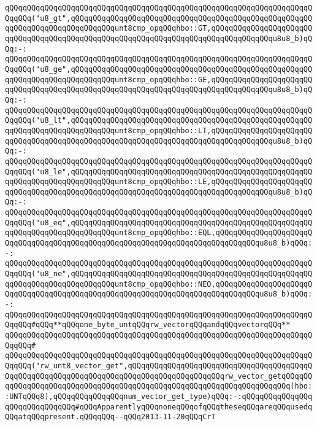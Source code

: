 \newline
\verb|qQQqqQQqqQQqqQQqqQQqqQQqqQQqqQQqqQQqqQQqqQQqqQQqqQQqqQQqqQQqqQQqqQQqqQQqqQQq("u8_gt",qQQqqQQqqQQqqQQqqQQqqQQqqQQqqQQqqQQqqQQqqQQqqQQqqQQqqQQqqQQqqQQqqQQqqQQqqQQqqQQqunt8cmp_opqQQqhbo::GT,qQQqqQQqqQQqqQQqqQQqqQQqqQQqqQQqqQQqqQQqqQQqqQQqqQQqqQQqqQQqqQQqqQQqqQQqqQQqqQQqqQQqu8u8_b)qQQq:-:|\newline
\verb|qQQqqQQqqQQqqQQqqQQqqQQqqQQqqQQqqQQqqQQqqQQqqQQqqQQqqQQqqQQqqQQqqQQqqQQqqQQq("u8_ge",qQQqqQQqqQQqqQQqqQQqqQQqqQQqqQQqqQQqqQQqqQQqqQQqqQQqqQQqqQQqqQQqqQQqqQQqqQQqqQQqunt8cmp_opqQQqhbo::GE,qQQqqQQqqQQqqQQqqQQqqQQqqQQqqQQqqQQqqQQqqQQqqQQqqQQqqQQqqQQqqQQqqQQqqQQqqQQqqQQqqQQqu8u8_b)qQQq:-:|\newline
\verb|qQQqqQQqqQQqqQQqqQQqqQQqqQQqqQQqqQQqqQQqqQQqqQQqqQQqqQQqqQQqqQQqqQQqqQQqqQQq("u8_lt",qQQqqQQqqQQqqQQqqQQqqQQqqQQqqQQqqQQqqQQqqQQqqQQqqQQqqQQqqQQqqQQqqQQqqQQqqQQqqQQqunt8cmp_opqQQqhbo::LT,qQQqqQQqqQQqqQQqqQQqqQQqqQQqqQQqqQQqqQQqqQQqqQQqqQQqqQQqqQQqqQQqqQQqqQQqqQQqqQQqqQQqu8u8_b)qQQq:-:|\newline
\verb|qQQqqQQqqQQqqQQqqQQqqQQqqQQqqQQqqQQqqQQqqQQqqQQqqQQqqQQqqQQqqQQqqQQqqQQqqQQq("u8_le",qQQqqQQqqQQqqQQqqQQqqQQqqQQqqQQqqQQqqQQqqQQqqQQqqQQqqQQqqQQqqQQqqQQqqQQqqQQqqQQqunt8cmp_opqQQqhbo::LE,qQQqqQQqqQQqqQQqqQQqqQQqqQQqqQQqqQQqqQQqqQQqqQQqqQQqqQQqqQQqqQQqqQQqqQQqqQQqqQQqqQQqu8u8_b)qQQq:-:|\newline
\verb|qQQqqQQqqQQqqQQqqQQqqQQqqQQqqQQqqQQqqQQqqQQqqQQqqQQqqQQqqQQqqQQqqQQqqQQqqQQq("u8_eq",qQQqqQQqqQQqqQQqqQQqqQQqqQQqqQQqqQQqqQQqqQQqqQQqqQQqqQQqqQQqqQQqqQQqqQQqqQQqqQQqunt8cmp_opqQQqhbo::EQL,qQQqqQQqqQQqqQQqqQQqqQQqqQQqqQQqqQQqqQQqqQQqqQQqqQQqqQQqqQQqqQQqqQQqqQQqqQQqqQQqu8u8_b)qQQq:-:|\newline
\verb|qQQqqQQqqQQqqQQqqQQqqQQqqQQqqQQqqQQqqQQqqQQqqQQqqQQqqQQqqQQqqQQqqQQqqQQqqQQq("u8_ne",qQQqqQQqqQQqqQQqqQQqqQQqqQQqqQQqqQQqqQQqqQQqqQQqqQQqqQQqqQQqqQQqqQQqqQQqqQQqqQQqunt8cmp_opqQQqhbo::NEQ,qQQqqQQqqQQqqQQqqQQqqQQqqQQqqQQqqQQqqQQqqQQqqQQqqQQqqQQqqQQqqQQqqQQqqQQqqQQqqQQqu8u8_b)qQQq:-:|\newline
\newline
\verb|qQQqqQQqqQQqqQQqqQQqqQQqqQQqqQQqqQQqqQQqqQQqqQQqqQQqqQQqqQQqqQQqqQQqqQQqqQQq#qQQq**qQQqone_byte_untqQQqrw_vectorqQQqandqQQqvectorqQQq**|\newline
\verb|qQQqqQQqqQQqqQQqqQQqqQQqqQQqqQQqqQQqqQQqqQQqqQQqqQQqqQQqqQQqqQQqqQQqqQQqqQQq#|\newline
\verb|qQQqqQQqqQQqqQQqqQQqqQQqqQQqqQQqqQQqqQQqqQQqqQQqqQQqqQQqqQQqqQQqqQQqqQQqqQQq("rw_unt8_vector_get",qQQqqQQqqQQqqQQqqQQqqQQqqQQqqQQqqQQqqQQqqQQqqQQqqQQqqQQqqQQqqQQqqQQqqQQqqQQqqQQqqQQqqQQqqQQqrw_vector_getqQQqqQQqqQQqqQQqqQQqqQQqqQQqqQQqqQQqqQQqqQQqqQQqqQQqqQQqqQQqqQQqqQQqqQQq(hbo::UNTqQQq8),qQQqqQQqqQQqqQQqnum_vector_get_type)qQQq:-:qQQqqQQqqQQqqQQqqQQqqQQqqQQqqQQq#qQQqApparentlyqQQqnoneqQQqofqQQqtheseqQQqareqQQqusedqQQqatqQQqpresent.qQQqqQQq--qQQq2013-11-20qQQqCrT|\newline
